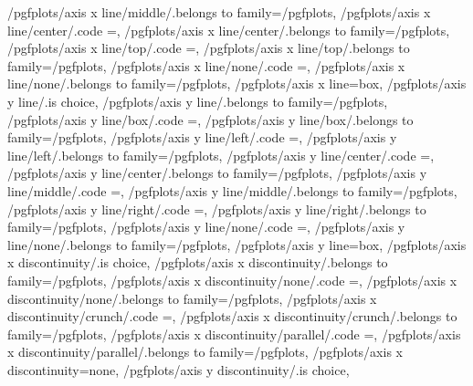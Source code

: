 {	/pgfplots/axis x line/middle/.belongs to family=/pgfplots, %
	/pgfplots/axis x line/center/.code	={\def\pgfplots@xaxislinesnum{2}\def\pgfplots@xtickposnum{2}},
	/pgfplots/axis x line/center/.belongs to family=/pgfplots, %
	/pgfplots/axis x line/top/.code	={\def\pgfplots@xaxislinesnum{3}\def\pgfplots@xtickposnum{3}},
	/pgfplots/axis x line/top/.belongs to family=/pgfplots, %
	/pgfplots/axis x line/none/.code	={\def\pgfplots@xaxislinesnum{4}\def\pgfplots@xtickposnum{4}},
	/pgfplots/axis x line/none/.belongs to family=/pgfplots, %
	/pgfplots/axis x line=box,
	/pgfplots/axis y line/.is choice,
	/pgfplots/axis y line/.belongs to family=/pgfplots, %
	/pgfplots/axis y line/box/.code	={\def\pgfplots@yaxislinesnum{0}\def\pgfplots@ytickposnum{0}},
	/pgfplots/axis y line/box/.belongs to family=/pgfplots, %
	/pgfplots/axis y line/left/.code	={\def\pgfplots@yaxislinesnum{1}\def\pgfplots@ytickposnum{1}},
	/pgfplots/axis y line/left/.belongs to family=/pgfplots, %
	/pgfplots/axis y line/center/.code	={\def\pgfplots@yaxislinesnum{2}\def\pgfplots@ytickposnum{2}},
	/pgfplots/axis y line/center/.belongs to family=/pgfplots, %
	/pgfplots/axis y line/middle/.code	={\def\pgfplots@yaxislinesnum{2}\def\pgfplots@ytickposnum{2}},
	/pgfplots/axis y line/middle/.belongs to family=/pgfplots, %
	/pgfplots/axis y line/right/.code	={\def\pgfplots@yaxislinesnum{3}\def\pgfplots@ytickposnum{3}},
	/pgfplots/axis y line/right/.belongs to family=/pgfplots, %
	/pgfplots/axis y line/none/.code	={\def\pgfplots@yaxislinesnum{4}\def\pgfplots@ytickposnum{4}},
	/pgfplots/axis y line/none/.belongs to family=/pgfplots, %
	/pgfplots/axis y line=box,
	/pgfplots/axis x discontinuity/.is choice,
	/pgfplots/axis x discontinuity/.belongs to family=/pgfplots, %
	/pgfplots/axis x discontinuity/none/.code	={\def\pgfplots@xaxisdiscontnum{0}},
	/pgfplots/axis x discontinuity/none/.belongs to family=/pgfplots, %
	/pgfplots/axis x discontinuity/crunch/.code	={\def\pgfplots@xaxisdiscontnum{1}},
	/pgfplots/axis x discontinuity/crunch/.belongs to family=/pgfplots, %
	/pgfplots/axis x discontinuity/parallel/.code	={\def\pgfplots@xaxisdiscontnum{2}},
	/pgfplots/axis x discontinuity/parallel/.belongs to family=/pgfplots, %
	/pgfplots/axis x discontinuity=none,
	/pgfplots/axis y discontinuity/.is choice,
}
